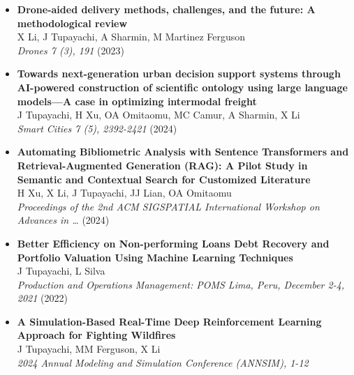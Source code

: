 \documentclass[10pt, letterpaper]{article}
\begin{document}
    \begin{itemize}[left=0pt] %
        \item \textbf{Drone-aided delivery methods, challenges, and the future: A methodological review} \\
        X Li, J Tupayachi, A Sharmin, M Martinez Ferguson \\
        \textit{Drones 7 (3), 191} (2023) \\
    
        \item \textbf{Towards next-generation urban decision support systems through AI-powered construction of scientific ontology using large language models—A case in optimizing intermodal freight} \\
        J Tupayachi, H Xu, OA Omitaomu, MC Camur, A Sharmin, X Li \\
        \textit{Smart Cities 7 (5), 2392-2421} (2024) \\
    
        \item \textbf{Automating Bibliometric Analysis with Sentence Transformers and Retrieval-Augmented Generation (RAG): A Pilot Study in Semantic and Contextual Search for Customized Literature} \\
        H Xu, X Li, J Tupayachi, JJ Lian, OA Omitaomu \\
        \textit{Proceedings of the 2nd ACM SIGSPATIAL International Workshop on Advances in …} (2024) \\
    
        \item \textbf{Better Efficiency on Non-performing Loans Debt Recovery and Portfolio Valuation Using Machine Learning Techniques} \\
        J Tupayachi, L Silva \\
        \textit{Production and Operations Management: POMS Lima, Peru, December 2-4, 2021} (2022) \\
    
    
        \item \textbf{A Simulation-Based Real-Time Deep Reinforcement Learning Approach for Fighting Wildfires} \\
        J Tupayachi, MM Ferguson, X Li \\
        \textit{2024 Annual Modeling and Simulation Conference (ANNSIM), 1-12} \\
    \end{itemize}
    
\end{document}

